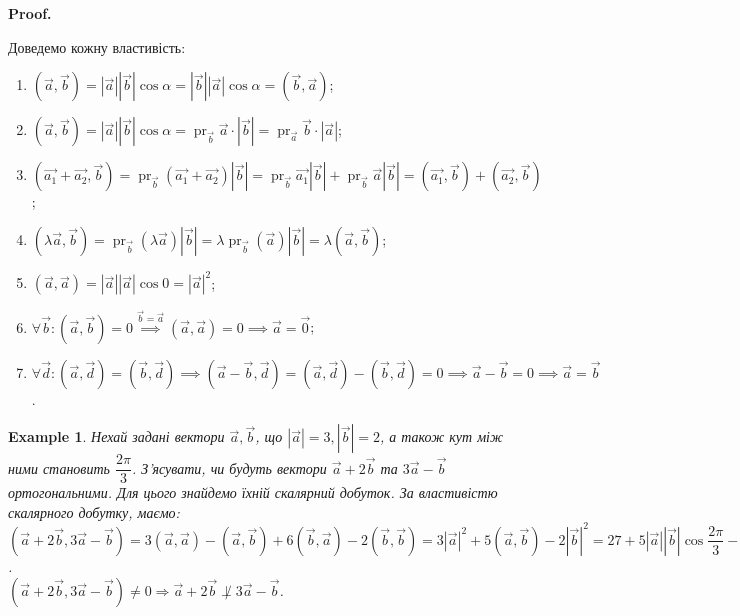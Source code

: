 \documentclass[a4paper, 10pt]{extarticle}
\makeatletter
\def\qed{$\blacksquare$}
\def\qed{$\blacksquare$}
\theoremstyle{theoremdd}
\theoremstyle{theoremdd}
\theoremstyle{theoremdd}
\theoremstyle{theoremdd}
\newtheorem{example}[theorem]{Example}
\theoremstyle{theoremdd}
\theoremstyle{theoremdd}
\theoremstyle{theoremdd}
\theoremstyle{theoremdd}
\renewenvironment{proof}[1][Proof.\\]{\par
\pushQED{\hfill \qed}%
\normalfont \topsep6\p@\@plus6\p@\relax
\trivlist
\item\relax
{\bfseries
#1\@addpunct{.}}\hspace\labelsep\ignorespaces
}{%
\popQED\endtrivlist\@endpefalse
}
\DeclareMathOperator{\pr}{pr}
\makeatother
\begin{document}
\begin{proof}
Доведемо кожну властивість:
\begin{enumerate}[wide=0pt,label={\arabic*)}]
	\item $(\vec{a}, \vec{b}) = |\vec{a}| |\vec{b}| \cos \alpha = |\vec{b}| |\vec{a}| \cos \alpha = (\vec{b}, \vec{a})$;
	\item $(\vec{a}, \vec{b}) = |\vec{a}| |\vec{b}| \cos \alpha = \pr_{\vec{b}} \vec{a} \cdot |\vec{b}| = \pr_{\vec{a}} \vec{b} \cdot |\vec{a}|$;
	\item $(\vec{a_1}+\vec{a_2}, \vec{b}) = \pr_{\vec{b}} (\vec{a_1} + \vec{a_2}) |\vec{b}| = \pr_{\vec{b}} \vec{a_1} |\vec{b}| + \pr_{\vec{b}} \vec{a} |\vec{b}| = (\vec{a_1}, \vec{b}) + (\vec{a_2}, \vec{b})$;
	\item $(\lambda \vec{a}, \vec{b}) = \pr_{\vec{b}} (\lambda \vec{a}) |\vec{b}| = \lambda \pr_{\vec{b}} (\vec{a}) |\vec{b}| = \lambda (\vec{a}, \vec{b})$;
	\item $(\vec{a}, \vec{a}) = |\vec{a}| |\vec{a}| \cos 0 = |\vec{a}|^2$;
	\item $\forall \vec{b}: (\vec{a}, \vec{b}) = 0 \overset{\vec{b} = \vec{a}}{\implies} (\vec{a}, \vec{a}) = 0 \implies \vec{a} = \vec{0}$;
	\item $\forall \vec{d}: (\vec{a}, \vec{d}) = (\vec{b}, \vec{d}) \implies (\vec{a}-\vec{b}, \vec{d}) = (\vec{a}, \vec{d}) - (\vec{b}, \vec{d}) = 0 \implies \vec{a} - \vec{b} = 0 \implies \vec{a} = \vec{b}$.
\end{enumerate}
\end{proof}

\begin{example}
	Нехай задані вектори $\vec{a}, \vec{b}$, що $|\vec{a}| = 3, |\vec{b}| = 2$, а також кут між ними становить $\dfrac{2 \pi}{3}$. З'ясувати, чи будуть вектори $\vec{a}+2 \vec{b}$ та $3 \vec{a} - \vec{b}$ ортогональними.
	Для цього знайдемо їхній скалярний добуток.
	За властивістю скалярного добутку, маємо:\\
	$(\vec{a} + 2 \vec{b}, 3 \vec{a} - \vec{b}) = 3 (\vec{a}, \vec{a}) - (\vec{a}, \vec{b}) + 6 (\vec{b}, \vec{a}) - 2 (\vec{b}, \vec{b}) = 3 |\vec{a}|^2 + 5 (\vec{a}, \vec{b}) - 2 |\vec{b}|^2 = 27 + 5 |\vec{a}| |\vec{b}| \cos \dfrac{2 \pi}{3} - 8 = 4$.\\
	$(\vec{a} + 2 \vec{b}, 3 \vec{a} - \vec{b}) \neq 0 \Rightarrow \vec{a} + 2 \vec{b} \not\perp 3 \vec{a} - \vec{b}$.
\end{example}
\end{document}
